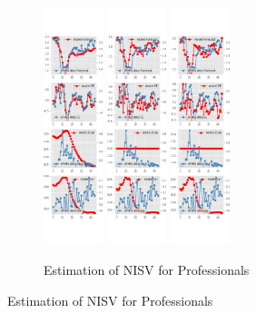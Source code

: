 \documentclass[]{article}
\begin{document}
\begin{figure}[ht]
	\centering
	\begin{subfigure}[b]{\textwidth}
		\centering
		\caption{Estimation of NISV for Professionals}
		\label{NISV_diag_SPF}
		\includegraphics[width=0.19\textwidth]{figures/spf_ni_est_sv_diag0.png}
		\includegraphics[width=0.19\textwidth]{figures/spf_ni_est_sv_diag1.png}
		\includegraphics[width=0.19\textwidth]{figures/spf_ni_est_sv_diag2.png}

\end{subfigure}
\end{figure}
\end{document}
